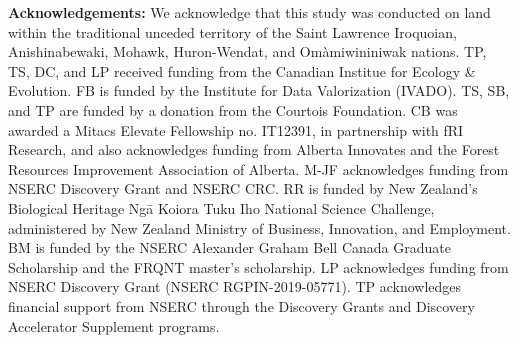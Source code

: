 \documentclass[11pt]{article}
\begin{document}
\textbf{Acknowledgements:} We acknowledge that this study was conducted
on land within the traditional unceded territory of the Saint Lawrence
Iroquoian, Anishinabewaki, Mohawk, Huron-Wendat, and Omàmiwininiwak
nations. TP, TS, DC, and LP received funding from the Canadian Institue
for Ecology \& Evolution. FB is funded by the Institute for Data
Valorization (IVADO). TS, SB, and TP are funded by a donation from the
Courtois Foundation. CB was awarded a Mitacs Elevate Fellowship no.
IT12391, in partnership with fRI Research, and also acknowledges funding
from Alberta Innovates and the Forest Resources Improvement Association
of Alberta. M-JF acknowledges funding from NSERC Discovery Grant and
NSERC CRC. RR is funded by New Zealand's Biological Heritage Ngā Koiora
Tuku Iho National Science Challenge, administered by New Zealand
Ministry of Business, Innovation, and Employment. BM is funded by the
NSERC Alexander Graham Bell Canada Graduate Scholarship and the FRQNT
master's scholarship. LP acknowledges funding from NSERC Discovery Grant
(NSERC RGPIN-2019-05771). TP acknowledges financial support from NSERC
through the Discovery Grants and Discovery Accelerator Supplement
programs.
\end{document}
